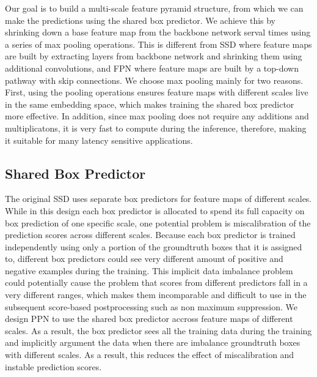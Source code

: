 \documentclass[10pt,twocolumn,letterpaper]{article}
\begin{document}
Our goal is to build a multi-scale feature pyramid
structure, from which we can make the predictions using the
shared box predictor.  We achieve this by shrinking down a
base feature map from the backbone network serval times
using a series of max pooling operations.  This is different
from SSD where feature maps are built by extracting layers
from backbone network and shrinking them using additional
convolutions, and FPN where feature maps are built by a
top-down pathway with skip connections.  We choose max
pooling mainly for two reasons.  First, using the pooling
operations ensures feature maps with different scales live
in the same embedding space, which makes training the shared
box predictor more effective.  In addition, since max
pooling does not require any additions and multiplicatons,
it is very fast to compute during the inference, therefore,
making it suitable for many latency sensitive applications.



\subsection{Shared Box Predictor}
The original SSD uses separate box predictors for feature maps of different scales.
While in this design
each box predictor is allocated to spend its full capacity on box prediction of one specific scale,
one potential problem is miscalibration of the prediction scores across different scales.
Because each box predictor is trained independently using only a portion of the groundtruth boxes that it is assigned to,
different box predictors could see very different amount of positive and negative examples during the training.
This implicit data imbalance problem could potentially cause the problem that
scores from different predictors fall in a very different ranges,
which makes them incomparable and difficult to use in the subsequent score-based postprocessing such as non maximum suppression.
We design PPN to use the shared box predictor accross feature maps of different scales.
As a result, the box predictor sees all the training data during the training
and implicitly argument the data when there are imbalance groundtruth boxes with different scales.
As a result, this reduces the effect of miscalibration and instable prediction scores.
\end{document}
